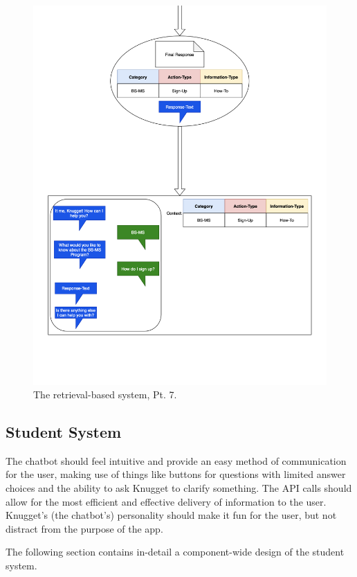 \documentclass[titlepage, 12pt]{article}
\begin{document}
\begin{figure}[p]
    \centering\includegraphics[width=1\linewidth]{images/retrieval-7.png}
    \caption{The retrieval-based system, Pt. 7.}
\end{figure}

\subsection{Student System}

The chatbot should feel intuitive and provide an easy method of communication for the user, making use of things like buttons for questions with limited answer choices and the ability to ask Knugget to clarify something. The API calls should allow for the most efficient and effective delivery of information to the user. Knugget’s (the chatbot’s) personality should make it fun for the user, but not distract from the purpose of the app.

The following section contains in-detail a component-wide design of the student system.
\end{document}
